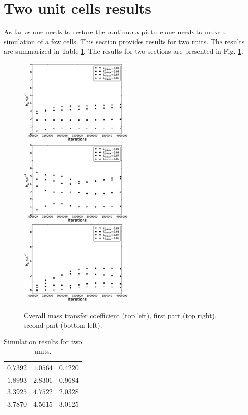 \documentclass{article}
\begin{document}
\section{Two unit cells results}
As far as one needs to restore the continuous picture one needs to make a simulation of a few
cells. This section provides results for two units. The results are summarized in Table
\ref{table:two_units}. The results for two sections are presented in Fig. \ref{fig:results:double}.
\begin{figure}[htb!]
\includegraphics[width=0.5\textwidth]{Figures/steady_double_overall.eps}
\includegraphics[width=0.5\textwidth]{Figures/steady_double_first.eps}\\
\includegraphics[width=0.5\textwidth]{Figures/steady_double_second.eps}
\caption{Overall mass transfer coefficient (top left), first part (top
right), second part (bottom left).\label{fig:results:double}}
\end{figure}
\begin{table}[htb!]
\begin{tabularx}{\textwidth}{|X|X|X|}
\hline
$0.7392$&$1.0564$&$0.4220$\\
$1.8993$&$2.8301$&$0.9684$\\
$3.3925$&$4.7522$&$2.0328$\\
$3.7870$&$4.5615$&$3.0125$\\
\hline
\end{tabularx}
\caption{Simulation results for two units. \label{table:two_units}}
\end{table}
\end{document}
